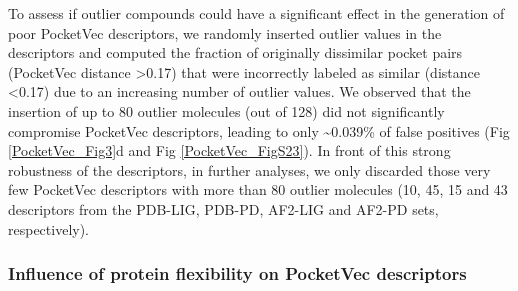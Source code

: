 To assess if outlier compounds could have a significant effect in the generation of poor PocketVec descriptors, we randomly inserted outlier values in the descriptors and computed the fraction of originally dissimilar pocket pairs (PocketVec distance >0.17) that were incorrectly labeled as similar (distance <0.17) due to an increasing number of outlier values. We observed that the insertion of up to 80 outlier molecules (out of 128) did not significantly compromise PocketVec descriptors, leading to only \textasciitilde0.039\% of false positives (Fig \ref{PocketVec_Fig3}d and Fig \ref{PocketVec_FigS23}). In front of this strong robustness of the descriptors, in further analyses, we only discarded those very few PocketVec descriptors with more than 80 outlier molecules (10, 45, 15 and 43 descriptors from the PDB-LIG, PDB-PD, AF2-LIG and AF2-PD sets, respectively). 




\subsubsection{Influence of protein flexibility on PocketVec descriptors}
\label{PocketVec_ResultsAndDiscussion_Influence_of_protein_flexibility}

